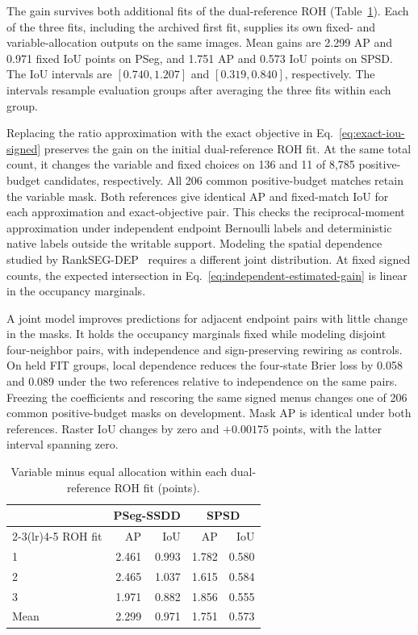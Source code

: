 \documentclass[journal]{IEEEtran}
\begin{document}
The gain survives both additional fits of the dual-reference ROH (Table~\ref{tab:dual-sign-seeds}). Each of the three fits, including the archived first fit, supplies its own fixed- and variable-allocation outputs on the same images. Mean gains are 2.299 AP and 0.971 fixed IoU points on PSeg, and 1.751 AP and 0.573 IoU points on SPSD. The IoU intervals are \([0.740,1.207]\) and \([0.319,0.840]\), respectively. The intervals resample evaluation groups after averaging the three fits within each group.

Replacing the ratio approximation with the exact objective in Eq.~\eqref{eq:exact-iou-signed} preserves the gain on the initial dual-reference ROH fit. At the same total count, it changes the variable and fixed choices on 136 and 11 of 8,785 positive-budget candidates, respectively. All 206 common positive-budget matches retain the variable mask. Both references give identical AP and fixed-match IoU for each approximation and exact-objective pair. This checks the reciprocal-moment approximation under independent endpoint Bernoulli labels and deterministic native labels outside the writable support. Modeling the spatial dependence studied by RankSEG-DEP~\cite{rankdep} requires a different joint distribution. At fixed signed counts, the expected intersection in Eq.~\eqref{eq:independent-estimated-gain} is linear in the occupancy marginals.

A joint model improves predictions for adjacent endpoint pairs with little change in the masks. It holds the occupancy marginals fixed while modeling disjoint four-neighbor pairs, with independence and sign-preserving rewiring as controls. On held FIT groups, local dependence reduces the four-state Brier loss by 0.058 and 0.089 under the two references relative to independence on the same pairs. Freezing the coefficients and rescoring the same signed menus changes one of 206 common positive-budget masks on development. Mask AP is identical under both references. Raster IoU changes by zero and \(+0.00175\) points, with the latter interval spanning zero.

\begin{table}[t]
\centering
\caption{Variable minus equal allocation within each dual-reference ROH fit (points).}
\label{tab:dual-sign-seeds}
\footnotesize
\begin{tabular}{@{}lrrrr@{}}
\toprule
 & \multicolumn{2}{c}{PSeg-SSDD} & \multicolumn{2}{c}{SPSD}\\
\cmidrule(lr){2-3}\cmidrule(lr){4-5}
ROH fit & AP & IoU & AP & IoU\\
\midrule
1 & 2.461 & 0.993 & 1.782 & 0.580\\
2 & 2.465 & 1.037 & 1.615 & 0.584\\
3 & 1.971 & 0.882 & 1.856 & 0.555\\
\midrule
Mean & 2.299 & 0.971 & 1.751 & 0.573\\
\bottomrule
\end{tabular}
\end{table}
\end{document}
